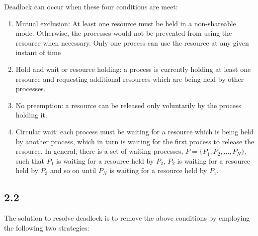 \documentclass[11pt, letterpaper]{article}
\begin{document}
Deadlock can occur when these four conditions are meet:

\begin{enumerate}
    \item Mutual exclusion: At least one resource must be held in a non-shareable mode. Otherwise, the processes would not be prevented from using the resource when necessary. Only one process can use the resource at any given instant of time
    \item Hold and wait or resource holding: a process is currently holding at least one resource and requesting additional resources which are being held by other processes.
    \item No preemption: a resource can be released only voluntarily by the process holding it.
    \item Circular wait: each process must be waiting for a resource which is being held by another process, which in turn is waiting for the first process to release the resource. In general, there is a set of waiting processes, $P = \{P_1, P_2, ..., P_N\}$, such that $P_1$ is waiting for a resource held by $P_2$, $P_2$ is waiting for a resource held by $P_3$ and so on until $P_N$ is waiting for a resource held by $P_1$.
\end{enumerate}

\subsection*{2.2}

The solution to resolve deadlock is to remove the above conditions by employing the following two strategies:
\end{document}
